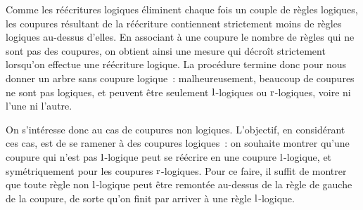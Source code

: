 Comme les réécritures logiques éliminent chaque fois un couple de règles
logiques, les coupures résultant de la réécriture contiennent strictement moins
de règles logiques au-dessus d'elles. En associant à une coupure le nombre de
règles qui ne sont pas des coupures, on obtient ainsi une mesure qui décroît
strictement lorsqu'on effectue une réécriture logique. La procédure
termine donc pour nous donner un arbre sans coupure logique~: malheureusement,
beaucoup de coupures ne sont pas logiques, et peuvent être seulement
$\operatorname{l}$-logiques ou $\operatorname{r}$-logiques, voire ni l'une ni l'autre.

On s'intéresse donc au cas de coupures non logiques. L'objectif, en considérant
ces cas, est de se ramener à des coupures logiques~: on souhaite montrer qu'une
coupure qui n'est pas $\operatorname{l}$-logique peut se réécrire en une coupure
$\operatorname{l}$-logique, et symétriquement pour les coupures $\operatorname{r}$-logiques. Pour ce
faire, il suffit de montrer que toute règle non $\operatorname{l}$-logique peut être
remontée au-dessus de la règle de gauche de la coupure, de sorte qu'on finit par
arriver à une règle $\operatorname{l}$-logique.

